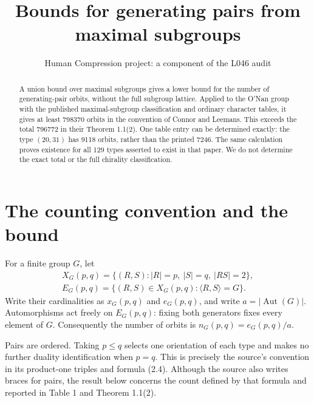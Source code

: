 \documentclass[11pt,a4paper]{article}
\title{Bounds for generating pairs from maximal subgroups}
\author{Human Compression project: a component of the L046 audit}
\date{}
\newcommand{\Aut}{\operatorname{Aut}}
\begin{document}
\maketitle
\begin{abstract}
A union bound over maximal subgroups gives a lower bound for the number
of generating-pair orbits, without the full subgroup lattice. Applied to
the O'Nan group with the published maximal-subgroup classification and
ordinary character tables, it gives at least 798370 orbits in the
convention of Connor and Leemans. This exceeds the total 796772 in
their Theorem 1.1(2). One table entry can be determined exactly:
the type $(20,31)$ has 9118 orbits, rather than the printed 7246.
The same calculation proves existence for all 129 types asserted to
exist in that paper. We do not determine the exact total or the full
chirality classification.
\end{abstract}

\section{The counting convention and the bound}
For a finite group $G$, let
\[
 \begin{gathered}
 X_G(p,q)=\{(R,S):|R|=p,\ |S|=q,\ |RS|=2\},\\
 E_G(p,q)=\{(R,S)\in X_G(p,q):\langle R,S\rangle=G\}.
 \end{gathered}
\]
Write their cardinalities as $x_G(p,q)$ and $e_G(p,q)$, and write
$a=|\Aut(G)|$. Automorphisms act freely on $E_G(p,q)$: fixing both
generators fixes every element of $G$. Consequently the number of
orbits is $n_G(p,q)=e_G(p,q)/a$.

Pairs are ordered. Taking $p\le q$ selects one orientation of each
type and makes no further duality identification when $p=q$.
This is precisely the source's convention in its product-one triples
and formula (2.4). Although the source also writes braces for pairs,
the result below concerns the count defined by that formula and
reported in Table 1 and Theorem 1.1(2).
\end{document}

